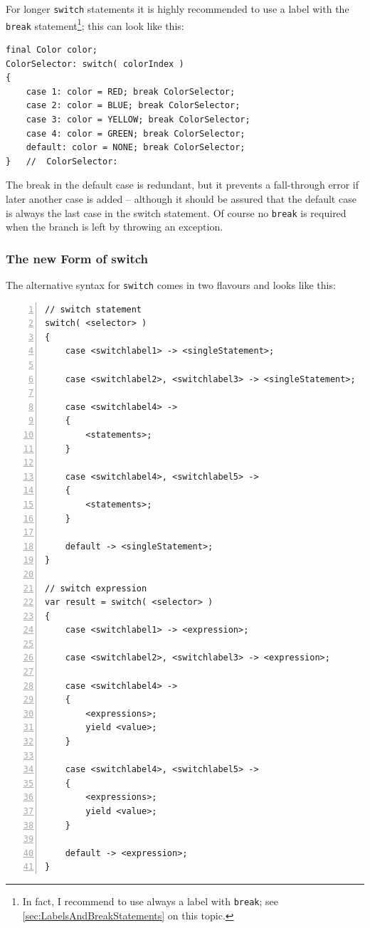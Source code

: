 \documentclass[12pt,a4paper,titlepage, parskip=half, headsepline, footsepline, cleardoubleplain]{scrbook}
\begin{document}
For longer \lstinline|switch| statements it is highly recommended to use a label with the \lstinline|break| statement\footnote{In fact, I recommend to use always a label with \lstinline|break|; see \ref{sec:LabelsAndBreakStatements} on this topic.}; this can look like this:
\begin{lstlisting}
final Color color;
ColorSelector: switch( colorIndex )
{
    case 1: color = RED; break ColorSelector;
    case 2: color = BLUE; break ColorSelector;
    case 3: color = YELLOW; break ColorSelector;
    case 4: color = GREEN; break ColorSelector;
    default: color = NONE; break ColorSelector;
}   //  ColorSelector:
\end{lstlisting}

The break in the default case is redundant, but it prevents a fall-through error if later another case is added – although it should be assured that the default case is always the last case in the switch statement. Of course no \lstinline|break| is required when the branch is left by throwing an exception.

\subsubsection{The new Form of switch}
The alternative syntax for \lstinline|switch| comes in two flavours and looks like this:

\begin{lstlisting}[numbers=left]
// switch statement
switch( <selector> )
{
    case <switchlabel1> -> <singleStatement>;

    case <switchlabel2>, <switchlabel3> -> <singleStatement>;

    case <switchlabel4> ->
    {
        <statements>;
    }

    case <switchlabel4>, <switchlabel5> ->
    {
        <statements>;
    }

    default -> <singleStatement>;
}

// switch expression
var result = switch( <selector> )
{
    case <switchlabel1> -> <expression>;

    case <switchlabel2>, <switchlabel3> -> <expression>;

    case <switchlabel4> ->
    {
        <expressions>;
        yield <value>;
    }

    case <switchlabel4>, <switchlabel5> ->
    {
        <expressions>;
        yield <value>;
    }

    default -> <expression>;
}
\end{lstlisting}
\end{document}
